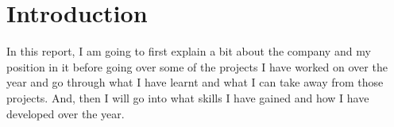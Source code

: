 \section{Introduction}{
	In this report, I am going to first explain a bit about the company and my position in it before going over some of the projects I have worked on over the year and go through what I have learnt and what I can take away from those projects. And, then I will go into what skills I have gained and how I have developed over the year.
}